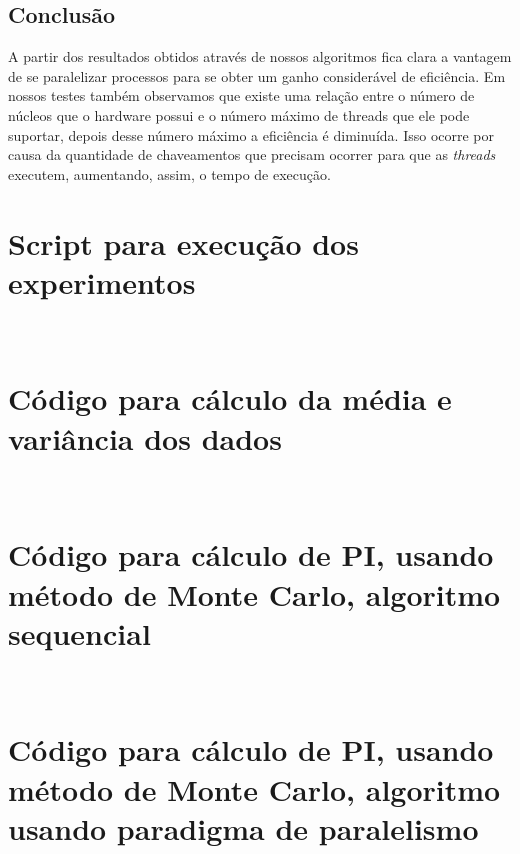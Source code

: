\documentclass[11pt,twoside]{article}
\begin{document}
\section{Conclusão}

    A partir dos resultados obtidos através de nossos algoritmos fica clara a vantagem
    de se paralelizar processos para se obter um ganho considerável de eficiência. Em
    nossos testes também observamos que existe uma relação entre o número de núcleos
    que o hardware possui e o número máximo de threads que ele pode suportar, depois
    desse número máximo a eficiência é diminuída. Isso ocorre por causa da quantidade
    de chaveamentos que precisam ocorrer para que as {\it threads} executem, aumentando,
    assim, o tempo de execução.

\clearpage

\begin{appendices}

    \chapter{Script para execução dos experimentos}
        

    \ \\

    \chapter{Código para cálculo da média e variância dos dados}
        
        
    \ \\
        
    \chapter{Código para cálculo de PI, usando método de Monte Carlo, algoritmo sequencial}
        
        
    \ \\
        
    \chapter{Código para cálculo de PI, usando método de Monte Carlo, algoritmo usando paradigma de paralelismo}
        
        

\end{appendices}
\end{document}
